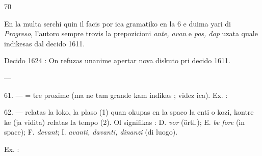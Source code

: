 \begin{VUpage}[74]{70}
{En la multa serchi quin il facis por ica gramatiko en la 6 e duima\nl
yari di \textit{Progreso}, l'autoro sempre trovis la prepozicioni \textit{ante, avan}\nl
e \textit{pos, dop} uzata quale indikesas dal decido 1611.

Decido 1624 : On refuzas unanime apertar nova diskuto pri\nl
decido 1611.%
}

\VUcontinue
{} --- \nl
{}\nl
{}

\VUblanc{5.55pt}%
61. ---  = tre proxime (ma ne tam grande kam\nl
indikas ; videz ica). Ex. : \nl
{}\nl
{}\nl
{}

\VUblanc{5.97pt}%
62. ---  relatas la loko, la plaso (1) quan okupas\nl
en la spaco la enti o kozi, kontre ke  (ja vidita)\nl
relatas la tempo (2). Ol signifikas : D. \textit{vor} (örtl.); E. \textit{be}\cc
\textit{fore} (in space); F. \textit{devant}; I. \textit{avanti, davanti, dinanzi} (di\nl
luogo).

Ex. : \parplein
\end{VUpage}

